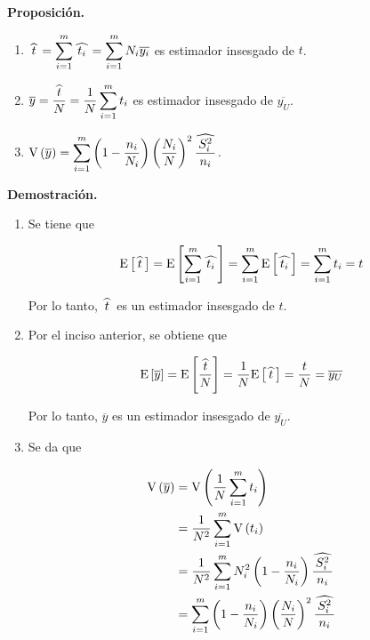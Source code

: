 \documentclass[12pt, fleqn]{article}
\newcommand{\gorro}[1]{\widehat{\hspace{0.7mm} #1 \hspace{0.7mm}}}
\newcommand{\E}[1]{\mathrm{E} \left[ #1 \right]}
\newcommand{\V}[1]{\mathrm{V} \left( #1 \right)}
\begin{document}
    \textbf{Proposición.}  
        \begin{enumerate}
            \item $ \displaystyle \gorro{t} = \sum_{i=1}^{m} \gorro{t_i} = \sum_{i=1}^{m} N_i \overline{y_i} $ es estimador insesgado de $t$.
            \item $ \displaystyle \overline{y} = \dfrac{\gorro{t}}{N} = \dfrac{1}{N} \sum_{i=1}^{m} t_i $ es estimador insesgado de $ \overline{y_U} $.
            \item $ \displaystyle \V{\overline{y}} = \sum_{i=1}^{m} \left( 1 - \dfrac{n_i}{N_i} \right) \left( \dfrac{N_i}{N} \right)^2 \dfrac{\gorro{S_i^2}}{n_i} $.
        \end{enumerate}

    \textbf{Demostración.} 

    \begin{enumerate}
        \item Se tiene que
        
        \begin{align*}
            \E{\gorro{t}} = \E{\sum_{i=1}^{m} \gorro{t_i}} = \sum_{i=1}^{m} \E{\gorro{t_i}} = \sum_{i=1}^{m} t_i = t
        \end{align*}

        Por lo tanto, $ \gorro{t} $ es un estimador insesgado de $t$.

        \item Por el inciso anterior, se obtiene que
        
        \begin{align*}
            \E{\overline{y}} = \E{\dfrac{\gorro{t}}{N}} = \dfrac{1}{N} \E{\gorro{t}} = \dfrac{t}{N} = \overline{y_U}
        \end{align*}

        Por lo tanto, $ \overline{y} $ es un estimador insesgado de $ \overline{y_U} $.

        \item Se da que
        
        \begin{align*}
            \V{\overline{y}} &= \V{\dfrac{1}{N} \sum_{i=1}^{m} t_i} \\
            &= \dfrac{1}{N^2} \sum_{i=1}^{m} \V{t_i} \\
            &= \dfrac{1}{N^2} \sum_{i=1}^{m} N_i^2 \left( 1 - \dfrac{n_i}{N_i} \right) \dfrac{\gorro{S_i^2}}{n_i} \\
            &= \sum_{i=1}^{m} \left( 1 - \dfrac{n_i}{N_i} \right) \left( \dfrac{N_i}{N} \right)^2 \dfrac{\gorro{S_i^2}}{n_i} 
        \end{align*}
    \end{enumerate}
\end{document}
